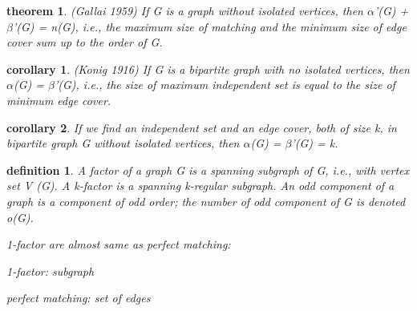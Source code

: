 \documentclass[twocolumn]{article}
\newtheorem{theorem}{theorem}[section]  %
\newtheorem{definition}{definition}
\newtheorem{corollary}{corollary}
\newtheorem{problem}{problem}
\newtheorem{solution}{solution}
\begin{document}
\begin{CJK*}{UTF8}{bkai}
    \begin{theorem}{(Gallai 1959)}
        If G is a graph without isolated vertices, then $\alpha$'(G) + $\beta$'(G) = n(G), i.e., the
 maximum size of matching and the minimum size of edge cover sum up to the
 order of G.
    \end{theorem}

    \begin{corollary}{(Konig 1916)}
        If G is a bipartite graph with no isolated vertices, then $\alpha$(G) = $\beta$'(G), i.e., the
 size of maximum independent set is equal to the size of minimum edge cover.
    \end{corollary}

    \begin{corollary}
        If we find an independent set and an edge cover, both of size k, in bipartite
 graph G without isolated vertices, then $\alpha$(G) = $\beta$'(G) = k.
    \end{corollary}

    \begin{definition}
        A factor of a graph G is a spanning subgraph of G, i.e., with vertex set V (G).
 A k-factor is a spanning k-regular subgraph. An odd component of a graph is
 a component of odd order; the number of odd component of G is denoted o(G).

 1-factor are almost same as perfect matching:

 1-factor: subgraph
 
 perfect matching: set of edges
    \end{definition}

    


\end{CJK*}
\end{document}
